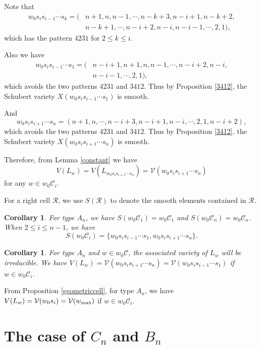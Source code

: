 \documentclass[11pt, reqno]{amsart}
\newtheorem{cor}[Thm]{Corollary}
\theoremstyle{definition}
\numberwithin{equation}{section}
\begin{document}
Note that \begin{align*}
    w_0s_is_{i-1}\cdots s_{k}=(&n+1,n,n-1,\cdots,n-k+3,n-i+1,n-k+2,\\
&n-k+1,\cdots,n-i+2,n-i,n-i-1,\cdots,2,1),
\end{align*} which has the  pattern $4231$ for $2\leq k\leq i$.

Also we have \begin{align*}
    w_0s_is_{i-1}\cdots s_{1}=(&n-i+1,n+1,n,n-1,\cdots,n-i+2,n-i,\\
    &n-i-1,\cdots,2,1),
\end{align*} which avoids the two patterns $4231$ and $3412$. Thus by Proposition \ref{3412}, the Schubert variety $X(w_0s_is_{i-1}\cdots s_{1})$ is smooth.


And $$w_0s_is_{i+1}\cdots s_{n}=(n+1,n,\cdots,n-i+3,n-i+1,n-i,\cdots,2,1,n-i+2),$$ which avoids the two patterns $4231$ and $3412$. Thus by Proposition \ref{3412}, the Schubert variety $X(w_0s_is_{i+1}\cdots s_{n})$ is smooth. 






Therefore, from  Lemma \ref{constant} we have $$V(L_w)=V(L_{w_0s_is_{i+1}\cdots s_{n}})=\mathcal{V}(w_0s_is_{i+1}\cdots s_{n})$$ for any $w\in w_0\mathcal{C}_{i}$.

For a right cell $\mathcal{R}$, we use $S(\mathcal{R})$ to denote the smooth elements contained in $\mathcal{R}$.
\begin{cor}
For type $A_{n}$,     we have $S(w_0\mathcal{C}_{1})=w_0\mathcal{C}_{1}$ and $S(w_0\mathcal{C}_{n})=w_0\mathcal{C}_{n}$.  When $2\leq i\leq n-1$, we have $$S(w_0\mathcal{C}_{i})=\{w_0s_is_{i-1}\cdots s_{1},w_0s_is_{i+1}\cdots s_{n}\}.$$
\end{cor}

\begin{cor}
   For type $A_{n}$ and $w\in w_0\mathcal{C}$, the associated variety of $L_w$ will be irreducible. We have $V(L_w)=\mathcal{V}(w_0s_is_{i+1}\cdots s_{n})=\mathcal{V}(w_0s_is_{i-1}\cdots s_{1})$ if  $w\in w_0\mathcal{C}_{i}$.
\end{cor}

From Proposition \ref{geometriccell}, for type $A_n$, we have $V(L_w)=\mathcal{V}(w_0s_i)=\mathcal{V}(w_{\rm max})$ if $w\in w_0\mathcal{C}_i$.





\section{The case of $C_n$ and $B_n$}\label{typebc}
\end{document}
